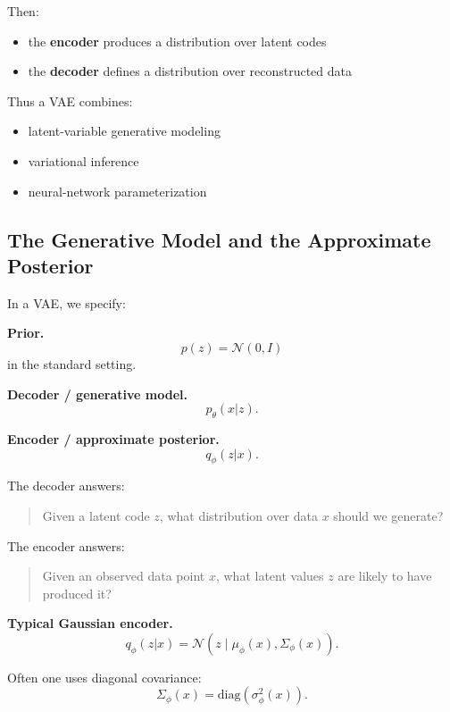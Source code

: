 Then:
\begin{itemize}
    \item the \textbf{encoder} produces a distribution over latent codes
    \item the \textbf{decoder} defines a distribution over reconstructed data
\end{itemize}

\medskip

\noindent
Thus a VAE combines:
\begin{itemize}
    \item latent-variable generative modeling
    \item variational inference
    \item neural-network parameterization
\end{itemize}

\subsection{The Generative Model and the Approximate Posterior}

In a VAE, we specify:

\medskip

\noindent
\textbf{Prior.}
\[
p(z)=\mathcal{N}(0,I)
\]
in the standard setting.

\medskip

\noindent
\textbf{Decoder / generative model.}
\[
p_\theta(x|z).
\]

\medskip

\noindent
\textbf{Encoder / approximate posterior.}
\[
q_\phi(z|x).
\]

\medskip

\noindent
The decoder answers:
\begin{quote}
Given a latent code $z$, what distribution over data $x$ should we generate?
\end{quote}

The encoder answers:
\begin{quote}
Given an observed data point $x$, what latent values $z$ are likely to have produced it?
\end{quote}

\medskip

\noindent
\textbf{Typical Gaussian encoder.}
\[
q_\phi(z|x)=\mathcal{N}(z\mid \mu_\phi(x), \Sigma_\phi(x)).
\]

Often one uses diagonal covariance:
\[
\Sigma_\phi(x)=\mathrm{diag}(\sigma_\phi^2(x)).
\]

\medskip

